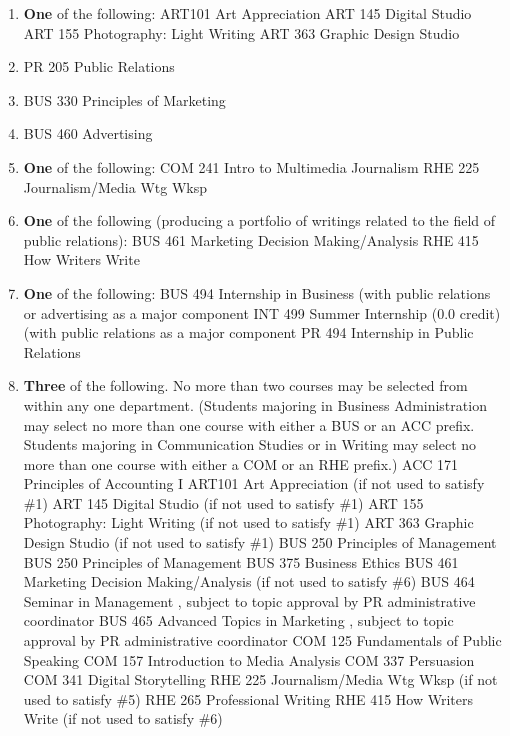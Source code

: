 \documentclass[
  letterpaper,
]{scrbook}
\begin{document}
\begin{enumerate}
\def\labelenumi{\arabic{enumi}.}
\item
  \textbf{One} of the following: ART101 Art Appreciation ART 145 Digital
  Studio ART 155 Photography: Light Writing ART 363 Graphic Design
  Studio
\item
  PR 205 Public Relations
\item
  BUS 330 Principles of Marketing
\item
  BUS 460 Advertising
\item
  \textbf{One} of the following: COM 241 Intro to Multimedia Journalism
  RHE 225 Journalism/Media Wtg Wksp
\item
  \textbf{One} of the following (producing a portfolio of writings
  related to the field of public relations): BUS 461 Marketing Decision
  Making/Analysis RHE 415 How Writers Write
\item
  \textbf{One} of the following: BUS 494 Internship in Business (with
  public relations or advertising as a major component INT 499 Summer
  Internship (0.0 credit) (with public relations as a major component PR
  494 Internship in Public Relations
\item
  \textbf{Three} of the following. No more than two courses may be
  selected from within any one department. (Students majoring in
  Business Administration may select no more than one course with either
  a BUS or an ACC prefix. Students majoring in Communication Studies or
  in Writing may select no more than one course with either a COM or an
  RHE prefix.) ACC 171 Principles of Accounting I ART101 Art
  Appreciation (if not used to satisfy \#1) ART 145 Digital Studio (if
  not used to satisfy \#1) ART 155 Photography: Light Writing (if not
  used to satisfy \#1) ART 363 Graphic Design Studio (if not used to
  satisfy \#1) BUS 250 Principles of Management BUS 250 Principles of
  Management BUS 375 Business Ethics BUS 461 Marketing Decision
  Making/Analysis (if not used to satisfy \#6) BUS 464 Seminar in
  Management , subject to topic approval by PR administrative
  coordinator BUS 465 Advanced Topics in Marketing , subject to topic
  approval by PR administrative coordinator COM 125 Fundamentals of
  Public Speaking COM 157 Introduction to Media Analysis COM 337
  Persuasion COM 341 Digital Storytelling RHE 225 Journalism/Media Wtg
  Wksp (if not used to satisfy \#5) RHE 265 Professional Writing RHE 415
  How Writers Write (if not used to satisfy \#6)
\end{enumerate}
\end{document}
